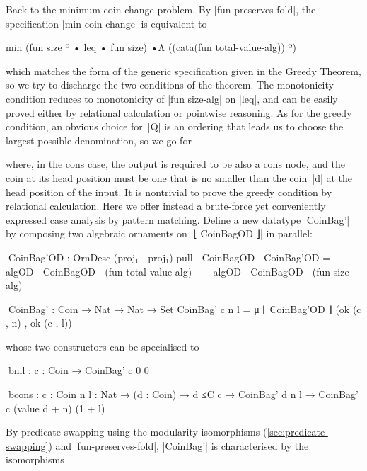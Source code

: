 Back to the minimum coin change problem.
By |fun-preserves-fold|, the specification |min-coin-change| is equivalent to
\begin{code}
min (fun size º • leq • fun size) •Λ ((cata(fun total-value-alg)) º)
\end{code}
which matches the form of the generic specification given in the Greedy Theorem, so we try to discharge the two conditions of the theorem.
The monotonicity condition reduces to monotonicity of |fun size-alg| on |leq|, and can be easily proved either by relational calculation or pointwise reasoning.
As for the greedy condition, an obvious choice for~|Q| is an ordering that leads us to choose the largest possible denomination, so we go for
where, in the cons case, the output is required to be also a cons node, and the coin at its head position must be one that is no smaller than the coin~|d| at the head position of the input.
It is nontrivial to prove the greedy condition by relational calculation.
Here we offer instead a brute-force yet conveniently expressed case analysis by pattern matching.
Define a new datatype |CoinBag'| by composing two algebraic ornaments on |⌊ CoinBagOD ⌋| in parallel:
\begin{code}
^^^CoinBag'OD : OrnDesc (proj₁ ⋈ proj₁) pull ⌊ CoinBagOD ⌋
CoinBag'OD =  ⌈ algOD ⌊ CoinBagOD ⌋ (fun total-value-alg) ⌉ ⊗
              ⌈ algOD ⌊ CoinBagOD ⌋ (fun size-alg) ⌉

^^^CoinBag' : Coin → Nat → Nat → Set
CoinBag' c n l = μ ⌊ CoinBag'OD ⌋ (ok (c , n) , ok (c , l))
\end{code}
whose two constructors can be specialised to
\begin{code}
^^^bnil   :  {c : Coin} → CoinBag' c 0 0

^^^bcons  :  {c : Coin} {n l : Nat} → (d : Coin) → d ≤C c →
             CoinBag' d n l → CoinBag' c (value d + n) (1 + l)
\end{code}
By predicate swapping using the modularity isomorphisms (\autoref{sec:predicate-swapping}) and |fun-preserves-fold|, |CoinBag'| is characterised by the isomorphisms
